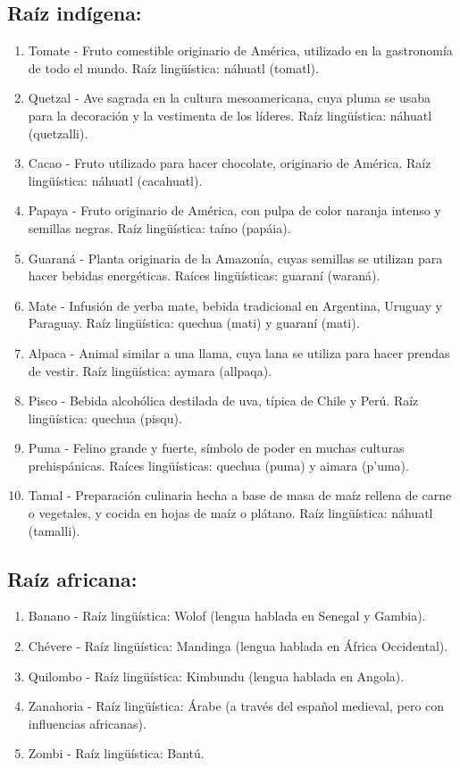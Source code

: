 \documentclass{article}
\begin{document}
\subsection*{Raíz indígena:}
    \begin{enumerate}
        \item Tomate - Fruto comestible originario de América, utilizado en la gastronomía de todo el mundo. Raíz lingüística: náhuatl (tomatl).
        \item Quetzal - Ave sagrada en la cultura mesoamericana, cuya pluma se usaba para la decoración y la vestimenta de los líderes. Raíz lingüística: náhuatl (quetzalli).
        \item Cacao - Fruto utilizado para hacer chocolate, originario de América. Raíz lingüística: náhuatl (cacahuatl).
        \item Papaya - Fruto originario de América, con pulpa de color naranja intenso y semillas negras. Raíz lingüística: taíno (papáia).
        \item Guaraná - Planta originaria de la Amazonía, cuyas semillas se utilizan para hacer bebidas energéticas. Raíces lingüísticas: guaraní (waraná).
        \item Mate - Infusión de yerba mate, bebida tradicional en Argentina, Uruguay y Paraguay. Raíz lingüística: quechua (mati) y guaraní (mati).
        \item Alpaca - Animal similar a una llama, cuya lana se utiliza para hacer prendas de vestir. Raíz lingüística: aymara (allpaqa).
        \item Pisco - Bebida alcohólica destilada de uva, típica de Chile y Perú. Raíz lingüística: quechua (pisqu).
        \item Puma - Felino grande y fuerte, símbolo de poder en muchas culturas prehispánicas. Raíces lingüísticas: quechua (puma) y aimara (p'uma).
        \item Tamal - Preparación culinaria hecha a base de masa de maíz rellena de carne o vegetales, y cocida en hojas de maíz o plátano. Raíz lingüística: náhuatl (tamalli).
    \end{enumerate}

\subsection*{Raíz africana:}
    \begin{enumerate}
        \item Banano - Raíz lingüística: Wolof (lengua hablada en Senegal y Gambia).
        \item Chévere - Raíz lingüística: Mandinga (lengua hablada en África Occidental).
        \item Quilombo - Raíz lingüística: Kimbundu (lengua hablada en Angola).
        \item Zanahoria - Raíz lingüística: Árabe (a través del español medieval, pero con influencias africanas).
        \item Zombi - Raíz lingüística: Bantú.
    \end{enumerate}
\end{document}

